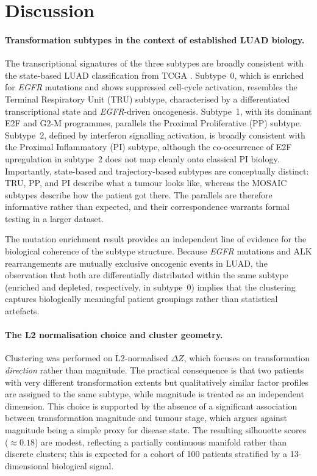 \section{Discussion}
\label{sec:discussion}

\paragraph{Transformation subtypes in the context of established LUAD biology.}
The transcriptional signatures of the three subtypes are broadly consistent with the
state-based LUAD classification from TCGA \cite{tcga2014luad}.
Subtype~0, which is enriched for \textit{EGFR} mutations and shows suppressed
cell-cycle activation, resembles the Terminal Respiratory Unit (TRU) subtype,
characterised by a differentiated transcriptional state and \textit{EGFR}-driven
oncogenesis.
Subtype~1, with its dominant E2F and G2-M programmes, parallels the Proximal
Proliferative (PP) subtype.
Subtype~2, defined by interferon signalling activation, is broadly consistent with the
Proximal Inflammatory (PI) subtype, although the co-occurrence of E2F upregulation in
subtype~2 does not map cleanly onto classical PI biology.
Importantly, state-based and trajectory-based subtypes are conceptually distinct: TRU,
PP, and PI describe what a tumour looks like, whereas the MOSAIC subtypes describe
how the patient got there.
The parallels are therefore informative rather than expected, and their correspondence
warrants formal testing in a larger dataset.

The mutation enrichment result provides an independent line of evidence for the
biological coherence of the subtype structure.
Because \textit{EGFR} mutations and ALK rearrangements are mutually exclusive oncogenic
events in LUAD, the observation that both are differentially distributed within the same
subtype (enriched and depleted, respectively, in subtype~0) implies that the clustering
captures biologically meaningful patient groupings rather than statistical artefacts.

\paragraph{The L2 normalisation choice and cluster geometry.}
Clustering was performed on L2-normalised $\Delta Z$, which focuses on transformation
\emph{direction} rather than magnitude.
The practical consequence is that two patients with very different transformation
extents but qualitatively similar factor profiles are assigned to the same subtype,
while magnitude is treated as an independent dimension.
This choice is supported by the absence of a significant association between
transformation magnitude and tumour stage, which argues against magnitude being a
simple proxy for disease state.
The resulting silhouette scores ($\approx 0.18$) are modest, reflecting a partially
continuous manifold rather than discrete clusters; this is expected for a cohort of
100 patients stratified by a 13-dimensional biological signal.

